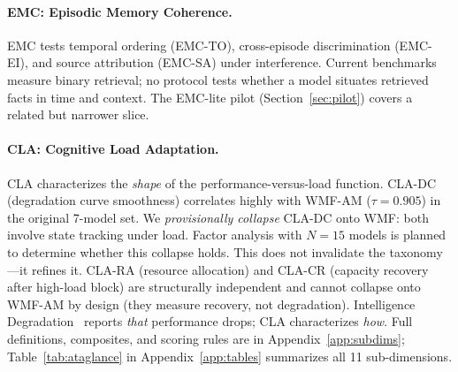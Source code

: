 \documentclass{article}
\begin{document}
\begin{table}[t]
\centering
\small
\caption{Metacognitive profile taxonomy. Each cell implies a different
intervention target.}
\label{tab:mcc}
\end{table}

\paragraph{EMC: Episodic Memory Coherence.}
EMC tests temporal ordering (EMC-TO), cross-episode discrimination
(EMC-EI), and source attribution (EMC-SA) under interference. Current
benchmarks measure binary retrieval; no protocol tests whether a model
situates retrieved facts in time and context. The EMC-lite pilot
(Section~\ref{sec:pilot}) covers a related but narrower slice.

\paragraph{CLA: Cognitive Load Adaptation.}
CLA characterizes the \emph{shape} of the performance-versus-load
function. CLA-DC (degradation curve smoothness) correlates highly with
WMF-AM ($\tau = 0.905$) in the original 7-model set. We \emph{provisionally
collapse} CLA-DC onto WMF: both involve state tracking under load.
Factor analysis with $N{=}15$ models is planned to determine whether
this collapse holds. This does not invalidate the taxonomy---it
refines it.
CLA-RA (resource allocation) and CLA-CR (capacity recovery after
high-load block) are structurally independent and cannot collapse onto
WMF-AM by design (they measure recovery, not degradation).
Intelligence Degradation~\citep{wang2026intelligence} reports
\emph{that} performance drops; CLA characterizes \emph{how}.
Full definitions, composites, and scoring rules are in
Appendix~\ref{app:subdims}; Table~\ref{tab:ataglance} in
Appendix~\ref{app:tables} summarizes all 11 sub-dimensions.
\end{document}
